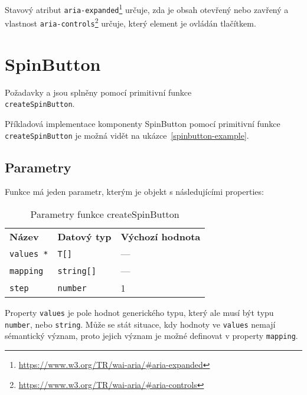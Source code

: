 Stavový atribut \texttt{aria-expanded}\footnote{\url{https://www.w3.org/TR/wai-aria/\#aria-expanded}} určuje, zda je obsah otevřený nebo zavřený a vlastnost \texttt{aria-controls}\footnote{\url{https://www.w3.org/TR/wai-aria/\#aria-controls}} určuje, který element je ovládán tlačítkem.

\clearpage

\section{SpinButton}

Požadavky \hyperref[sfr11]{} a \hyperref[sfr12]{} jsou splněny pomocí primitivní funkce\\ \texttt{createSpinButton}.

Příkladová implementace komponenty SpinButton pomocí primitivní funkce \texttt{createSpinButton} je možná vidět na ukázce~\ref{spinbutton-example}.

\subsection{Parametry}

Funkce má jeden parametr, kterým je objekt s následujícími properties:

\begin{table}[ht]\label{table:spinbutton-params}
    \begin{ctucolortab}
        \begin{tabularx}{\textwidth}{X X X}
            \bfseries Název   & \bfseries Datový typ & \bfseries Výchozí hodnota \\\Midrule{}
            \texttt{values *} & \texttt{T[]}         & ---                       \\
            \texttt{mapping}  & \texttt{string[]}    & ---                       \\
            \texttt{step}     & \texttt{number}      & 1
        \end{tabularx}
    \end{ctucolortab}
    \caption{Parametry funkce createSpinButton}
\end{table}

Property \texttt{values} je pole hodnot generického typu, který ale musí být typu \texttt{number}, nebo \texttt{string}.
Může se stát situace, kdy hodnoty ve \texttt{values} nemají sémantický význam, proto jejich význam je možné definovat v property \texttt{mapping}.

